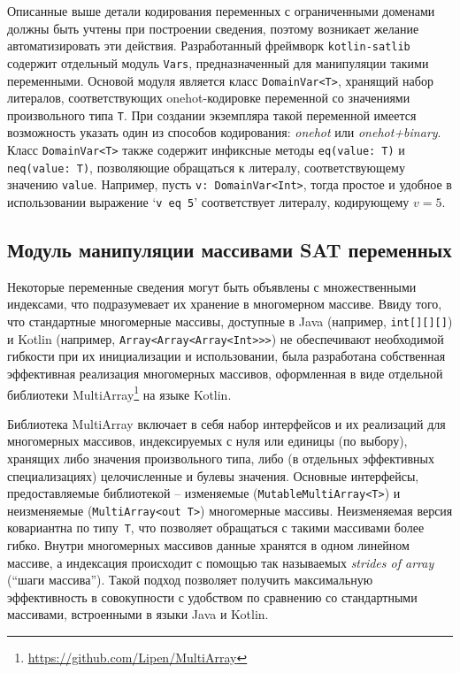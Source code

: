 Описанные выше детали кодирования переменных с ограниченными доменами должны быть учтены при построении сведения, поэтому возникает желание автоматизировать эти действия.
Разработанный фреймворк \texttt{kotlin-satlib} содержит отдельный модуль \texttt{Vars}, предназначенный для манипуляции такими переменными.
Основой модуля является класс \texttt{DomainVar<T>}, хранящий набор литералов, соответствующих onehot-кодировке переменной со значениями произвольного типа \texttt{T}.
При создании экземпляра такой переменной имеется возможность указать один из способов кодирования: \textit{onehot} или \textit{onehot+binary}.
Класс \texttt{DomainVar<T>} также содержит инфиксные методы \texttt{eq(value:~T)} и \texttt{neq(value:~T)}, позволяющие обращаться к литералу, соответствующему значению \texttt{value}.
Например, пусть \texttt{v:~DomainVar<Int>}, тогда простое и удобное в использовании выражение `\texttt{v~eq~5}' соответствует литералу, кодирующему $v = 5$.

\subsection{Модуль манипуляции массивами SAT переменных}

Некоторые переменные сведения могут быть объявлены с множественными индексами, что подразумевает их хранение в многомерном массиве.
Ввиду того, что стандартные многомерные массивы, доступные в Java (например, \texttt{int[][][]}) и Kotlin (например, \texttt{Array<\-Array<\-Array<Int>>>}) не обеспечивают необходимой гибкости при их инициализации и использовании, была разработана собственная эффективная реализация многомерных массивов, оформленная в виде отдельной библиотеки MultiArray\footnote{\url{https://github.com/Lipen/MultiArray}} на языке Kotlin.

Библиотека MultiArray включает в себя набор интерфейсов и их реализаций для многомерных массивов, индексируемых с нуля или единицы (по выбору), хранящих либо значения произвольного типа, либо (в отдельных эффективных специализациях) целочисленные и булевы значения.
Основные интерфейсы, предоставляемые библиотекой \--- изменяемые (\texttt{Mutable\-Multi\-Array<T>}) и неизменяемые (\texttt{Multi\-Array<out~T>}) многомерные массивы.
Неизменяемая версия ковариантна по типу~\texttt{T}, что позволяет обращаться с такими массивами более гибко.
Внутри многомерных массивов данные хранятся в одном линейном массиве, а индексация происходит с помощью так называемых \textit{strides of array} (\enquote{шаги массива}).
Такой подход позволяет получить максимальную эффективность в совокупности с удобством по сравнению со стандартными массивами, встроенными в языки Java и Kotlin.


